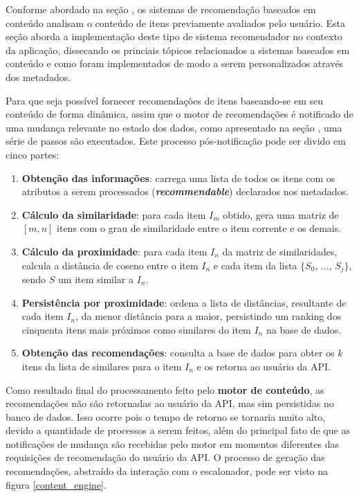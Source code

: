 Conforme abordado na seção , os sistemas de recomendação baseados em conteúdo analisam o conteúdo de itens previamente avaliados pelo usuário. Esta seção aborda a implementação deste tipo de sistema recomendador no contexto da aplicação, dissecando os princiais tópicos relacionados a sistemas baseados em conteúdo e como foram implementados de modo a serem personalizados através dos metadados.

Para que seja possível fornecer recomendações de itens baseando-se em seu conteúdo de forma dinâmica, assim que o motor de recomendações é notificado de uma mudança relevante no estado dos dados, como apresentado na seção , uma série de passos são executados. Este processo pós-notificação pode ser divido em cinco partes:

\begin{enumerate}
	\item \textbf{Obtenção das informações}: carrega uma lista de todos os itens com os atributos a serem processados (\textbf{\textit{recommendable}}) declarados nos metadados.

	\item \textbf{Cálculo da similaridade}: para cada item $I_{m}$ obtido, gera uma matriz de $[m, n]$ itens com o grau de similaridade entre o item corrente e os demais.

	\item \textbf{Cálculo da proximidade}: para cada item $I_n$ da matriz de similaridades, calcula a distância de coseno entre o item $I_n$ e cada item da lista $\lbrace S_{0}$, ..., $S_{j} \rbrace$, sendo $S$ um item similar a $I_{n}$.

	\item \textbf{Persistência por proximidade}: ordena a lista de distâncias, resultante de cada item $I_{n}$, da menor distância para a maior, persistindo um ranking dos cinquenta itens mais próximos como similares do item $I_{n}$ na base de dados.

	\item \textbf{Obtenção das recomendações}: consulta a base de dados para obter os $k$ itens da lista de similares para o item $I_{n}$ e os retorna ao usuário da API.
\end{enumerate}

Como resultado final do processamento feito pelo \textbf{motor de conteúdo}, as recomendações não são retornadas ao usuário da API, mas sim persistidas no banco de dados. Isso ocorre pois o tempo de retorno se tornaria muito alto, devido a quantidade de processos a serem feitos, além do principal fato de que as notificações de mudança são recebidas pelo motor em momentos diferentes das requisições de recomendação do usuário da API. O processo de geração das recomendações, abstraído da interação com o escalonador, pode ser visto na figura \ref{content_engine}. 

